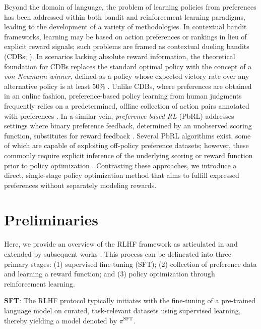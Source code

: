 Beyond the domain of language, the problem of learning policies from preferences has been addressed within both bandit and reinforcement learning paradigms, leading to the development of a variety of methodologies. In contextual bandit frameworks, learning may be based on action preferences or rankings in lieu of explicit reward signals; such problems are framed as contextual dueling bandits (CDBs; \cite{yue2012karmed,dudik2015contextual}). In scenarios lacking absolute reward information, the theoretical foundation for CDBs replaces the standard optimal policy with the concept of a \textit{von Neumann winner}, defined as a policy whose expected victory rate over any alternative policy is at least 50\% \citep{dudik2015contextual}. Unlike CDBs, where preferences are obtained in an online fashion, preference-based policy learning from human judgments frequently relies on a predetermined, offline collection of action pairs annotated with preferences \citep{yan2022human}. In a similar vein, \textit{preference-based RL} (PbRL) addresses settings where binary preference feedback, determined by an unobserved scoring function, substitutes for reward feedback \citep{BusaFekete2014,ruiz2023dueling}. Several PbRL algorithms exist, some of which are capable of exploiting off-policy preference datasets; however, these commonly require explicit inference of the underlying scoring or reward function prior to policy optimization \citep{jain2013learning,BusaFekete2014,christiano2017deep,sadigh2017active,kupcsik2018learning}. Contrasting these approaches, we introduce a direct, single-stage policy optimization method that aims to fulfill expressed preferences without separately modeling rewards.

\section{Preliminaries}\label{section:prelims}

Here, we provide an overview of the RLHF framework as articulated in \citeauthor{ziegler2020finetuning} and extended by subsequent works \citep{stiennon2022learning, bai2022training, ouyang2022training}. This process can be delineated into three primary stages: (1) supervised fine-tuning (SFT); (2) collection of preference data and learning a reward function; and (3) policy optimization through reinforcement learning.

\textbf{SFT}: The RLHF protocol typically initiates with the fine-tuning of a pre-trained language model on curated, task-relevant datasets using supervised learning, thereby yielding a model denoted by $\pi^\text{SFT}$.

